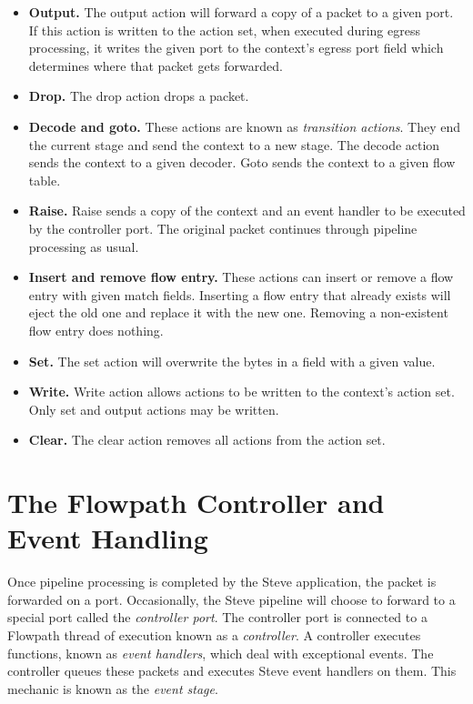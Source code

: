 \begin{itemize}

\item \textbf{Output.} The output action will forward a copy of a packet to a given
port. If this action is written to the action set, when executed during egress
processing, it writes the given port to the context's egress port field which
determines where that packet gets forwarded.

\item \textbf{Drop.} The drop action drops a packet.

\item \textbf{Decode and goto.} These actions are known as \textit{transition
actions}. They end the current stage and send the context to a new stage. The
decode action sends the context to a given decoder. Goto sends the context to a
given flow table.

\item \textbf{Raise.} Raise sends a copy of the context and an event handler to be
executed by the controller port. The original packet continues through pipeline
processing as usual.

\item \textbf{Insert and remove flow entry.} These actions can insert or remove a flow
entry with given match fields. Inserting a flow entry that already exists will
eject the old one and replace it with the new one. Removing a non-existent flow
entry does nothing.

\item \textbf{Set.} The set action will overwrite the bytes in a field with a given
value.

\item \textbf{Write.} Write action allows actions to be written to the context's
action set. Only set and output actions may be written.

\item \textbf{Clear.} The clear action removes all actions from the action set.

\end{itemize}

\section{The Flowpath Controller and Event Handling} \label{events_desc}

Once pipeline processing is completed by the Steve application, the packet is forwarded on a port. Occasionally, the Steve pipeline will choose to forward to a special port called the \textit{controller port}. The controller port is connected to a Flowpath thread of execution known as a \textit{controller}. A controller executes functions, known as \textit{event handlers}, which deal with exceptional events. The controller queues these packets and executes Steve event handlers on them. This mechanic is known as the \textit{event stage}.

